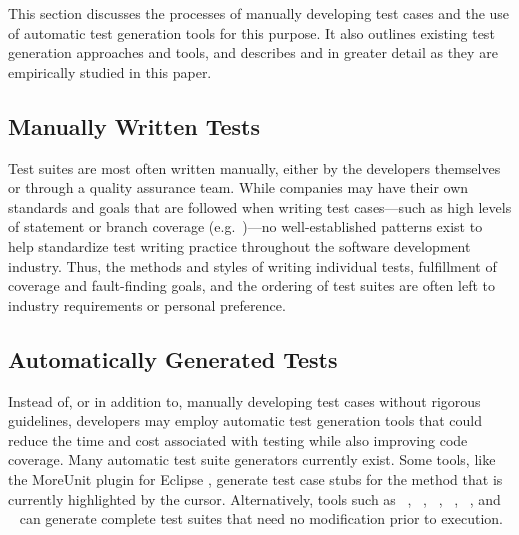 
This section discusses the processes of manually developing test cases and the
use of automatic test generation tools for this purpose.  It also outlines
existing test generation approaches and tools, and describes \evo and \codepro
in greater detail as they are empirically studied in this paper.

\subsection{Manually Written Tests}

Test suites are most often written manually, either by the developers themselves
or through a quality assurance team.  While companies may have their own
standards and goals that are followed when writing test cases---such as high
levels of statement or branch coverage (e.g.~\cite{DO-178B, IEC61508})---no
well-established patterns exist to help standardize test writing practice
throughout the software development industry. Thus, the methods and styles of
writing individual tests, fulfillment of coverage and fault-finding goals, and
the ordering of test suites are often left to industry requirements or personal
preference.

\subsection{Automatically Generated Tests}
Instead of, or in addition to, manually developing test cases without rigorous
guidelines, developers may employ automatic test generation tools that
could reduce the time and cost associated with testing while also improving code
coverage.  Many automatic test suite generators currently exist.  Some tools,
like the MoreUnit plugin for Eclipse \cite{moreunit}, generate test case stubs
for the method that is currently highlighted by the cursor.  Alternatively,
tools such as \codepro~\cite{CodePro1},
\evo~\cite{fraser:2011:eat:2025113.2025179}, \jcrasher~\cite{csallner2004},
\palus~\cite{zhang:2011:pha:1985793.1986036},
\randoop~\cite{pacheco2007feedback}, and
\testera~\cite{marinov:2001:tnf:872023.872551} can generate complete test suites
that need no modification prior to execution.

